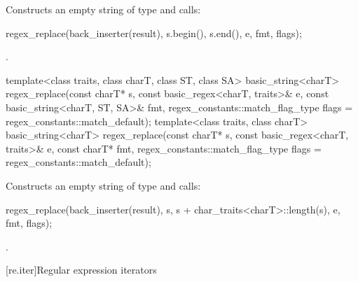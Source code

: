 \begin{itemdescr}
\pnum\effects  Constructs an empty string  of
type  and calls:
\begin{codeblock}
regex_replace(back_inserter(result), s.begin(), s.end(), e, fmt, flags);
\end{codeblock}

\pnum
\returns {}.
\end{itemdescr}

%
\begin{itemdecl}
template<class traits, class charT, class ST, class SA>
  basic_string<charT>
    regex_replace(const charT* s,
                  const basic_regex<charT, traits>& e,
                  const basic_string<charT, ST, SA>& fmt,
                  regex_constants::match_flag_type flags = regex_constants::match_default);
template<class traits, class charT>
  basic_string<charT>
    regex_replace(const charT* s,
                  const basic_regex<charT, traits>& e,
                  const charT* fmt,
                  regex_constants::match_flag_type flags = regex_constants::match_default);
\end{itemdecl}

\begin{itemdescr}
\pnum
\effects Constructs an empty string  of
type  and calls:
\begin{codeblock}
regex_replace(back_inserter(result), s, s + char_traits<charT>::length(s), e, fmt, flags);
\end{codeblock}

\pnum
\returns {}.
\end{itemdescr}

[re.iter]{Regular expression iterators}

